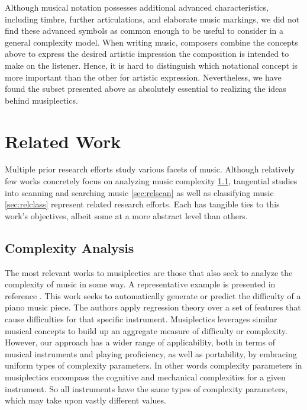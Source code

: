 \documentclass[12pt]{report}
\begin{document}
Although musical notation possesses additional advanced characteristics, including timbre, further articulations, and elaborate music markings, we did not find these advanced symbols as common enough to be useful to consider in a general complexity model. When writing music, composers combine the concepts above to express the desired artistic impression the composition is intended to make on the listener. Hence, it is hard to distinguish which notational concept is more important than the other for artistic expression. Nevertheless, we have found the subset presented above as absolutely essential to realizing the ideas behind musiplectics.

\chapter{Related Work} 
\label{sec:related}

Multiple prior research efforts study various facets of music. Although relatively few works concretely focus on analyzing music complexity \ref{sec:relcom}, tangential studies into scanning and searching music \ref{sec:relscan} as well as classifying music \ref{sec:relclass} represent related research efforts. Each has tangible ties to this work's objectives, albeit some at a more abstract level than others.


\section{Complexity Analysis}
\label{sec:relcom}

The most relevant works to musiplectics are those that also seek to analyze the complexity of music in some way. A representative example is presented in reference \cite{Chiu2012}. This work seeks to automatically generate or predict the difficulty of a piano music piece. The authors apply regression theory over a set of features that cause difficulties for that specific instrument. Musiplectics leverages similar musical concepts to build up an aggregate measure of difficulty or complexity. However, our approach has a wider range of applicability, both in terms of musical instruments and playing proficiency, as well as portability, by embracing uniform types of complexity parameters. In other words complexity parameters in musiplectics encompass the cognitive and mechanical complexities for a given instrument. So all instruments have the same types of complexity parameters, which may take upon vastly different values.
\end{document}
